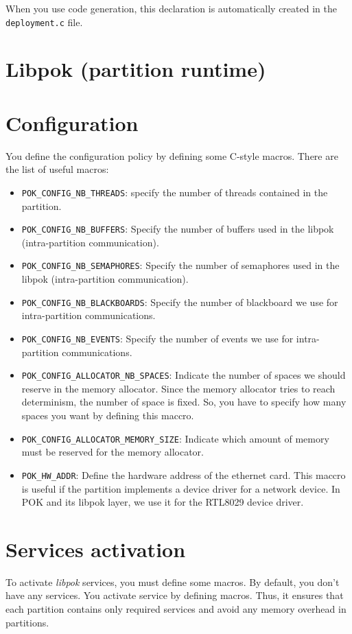    When you use code generation, this declaration is
   automatically created in the \texttt{deployment.c} file.

\section{Libpok (partition runtime)}
   \section{Configuration}
   You define the configuration policy by defining some C-style macros. There
   are the list of useful macros:
   \begin{itemize}
      \item
         \texttt{POK\_CONFIG\_NB\_THREADS}: specify the number of threads
         contained in the partition.
      \item
         \texttt{POK\_CONFIG\_NB\_BUFFERS}:
         Specify the number of buffers
         used in the libpok (intra-partition communication).
      \item
         \texttt{POK\_CONFIG\_NB\_SEMAPHORES}: Specify the number of semaphores
         used in the libpok (intra-partition communication).
      \item
         \texttt{POK\_CONFIG\_NB\_BLACKBOARDS}: Specify the number of blackboard
         we use for intra-partition communications.
      \item
         \texttt{POK\_CONFIG\_NB\_EVENTS}: Specify the number of events we use
         for intra-partition communications.
      \item
         \texttt{POK\_CONFIG\_ALLOCATOR\_NB\_SPACES}: Indicate the number of
         spaces we should reserve in the memory allocator. Since the memory
         allocator tries to reach determinism, the number of space is fixed. So,
         you have to specify how many spaces you want by defining this maccro.
      \item
         \texttt{POK\_CONFIG\_ALLOCATOR\_MEMORY\_SIZE}: Indicate which amount of
         memory must be reserved for the memory allocator.
      \item
         \texttt{POK\_HW\_ADDR}:
         Define the hardware address of the ethernet card. This maccro is useful
         if the partition implements a device driver for a network device. In
         POK and its libpok layer, we use it for the RTL8029 device driver.
   \end{itemize}

   \section{Services activation}
   To activate \textit{libpok} services, you must define some macros. By
   default, you don't have any services. You activate service by defining
   macros. Thus, it ensures that each partition contains only required services
   and avoid any memory overhead in partitions. 


